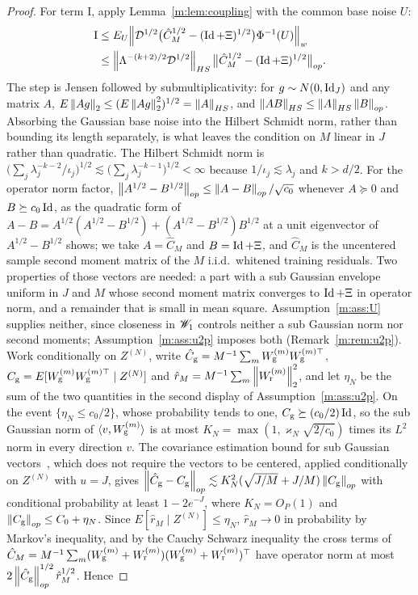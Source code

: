 \begin{proof}
For term I, apply Lemma~\ref{m:lem:coupling} with the common base noise $U$:
\[
\begin{aligned}
\mathrm I&\le E_U\Big\|\mathcal D^{1/2}\big(\hat C_M^{1/2}-(\operatorname{Id}+\Xi)^{1/2}\big)\Phi^{-1}(U)\Big\|_w\\
&\le\Big\|\Lambda^{-(k+2)/2}\mathcal D^{1/2}\Big\|_{HS}\,\big\|\hat C_M^{1/2}-(\operatorname{Id}+\Xi)^{1/2}\big\|_{op} .
\end{aligned}
\]
The step is Jensen followed by submultiplicativity: for $g\sim N(0,\operatorname{Id}_J)$ and any matrix $A$, $E\left\|Ag\right\|_2\le(E\left\|Ag\right\|_2^2)^{1/2}=\left\|A\right\|_{HS}$, and $\left\|AB\right\|_{HS}\le\left\|A\right\|_{HS}\left\|B\right\|_{op}$. Absorbing the Gaussian base noise into the Hilbert Schmidt norm, rather than bounding its length separately, is what leaves the condition on $M$ linear in $J$ rather than quadratic. The Hilbert Schmidt norm is $\big(\sum_j\lambda_j^{-k-2}/\iota_j\big)^{1/2}\lesssim\big(\sum_j\lambda_j^{-k-1}\big)^{1/2}<\infty$ because $1/\iota_j\lesssim\lambda_j$ and $k>d/2$. For the operator norm factor, $\left\|A^{1/2}-B^{1/2}\right\|_{op}\le\left\|A-B\right\|_{op}/\sqrt{c_0}$ whenever $A\succeq0$ and $B\succeq c_0\operatorname{Id}$, as the quadratic form of $A-B=A^{1/2}(A^{1/2}-B^{1/2})+(A^{1/2}-B^{1/2})B^{1/2}$ at a unit eigenvector of $A^{1/2}-B^{1/2}$ shows; we take $A=\hat C_M$ and $B=\operatorname{Id}+\Xi$, and $\hat C_M$ is the uncentered sample second moment matrix of the $M$ i.i.d.\ whitened training residuals. Two properties of those vectors are needed: a part with a sub Gaussian envelope uniform in $J$ and $M$ whose second moment matrix converges to $\operatorname{Id}+\Xi$ in operator norm, and a remainder that is small in mean square. Assumption~\ref{m:ass:U} supplies neither, since closeness in $\mathscr{W}_1$ controls neither a sub Gaussian norm nor second moments; Assumption~\ref{m:ass:u2p} imposes both (Remark~\ref{m:rem:u2p}). Work conditionally on $Z^{(N)}$, write $\hat C_{\rm g}=M^{-1}\sum_mW^{(m)}_{\rm g}W^{(m)\top}_{\rm g}$, $C_{\rm g}=E[W^{(m)}_{\rm g}W^{(m)\top}_{\rm g}\mid Z^{(N)}]$ and $\hat r_M=M^{-1}\sum_m\left\|W^{(m)}_{\rm r}\right\|^2_2$, and let $\eta_N$ be the sum of the two quantities in the second display of Assumption~\ref{m:ass:u2p}. On the event $\{\eta_N\le c_0/2\}$, whose probability tends to one, $C_{\rm g}\succeq(c_0/2)\operatorname{Id}$, so the sub Gaussian norm of $\langle v,W^{(m)}_{\rm g}\rangle$ is at most $K_N=\max(1,\varkappa_N\sqrt{2/c_0})$ times its $L^2$ norm in every direction $v$. The covariance estimation bound for sub Gaussian vectors~\cite[Theorem 4.7.1 and Exercise 4.7.3]{vershynin2018}, which does not require the vectors to be centered, applied conditionally on $Z^{(N)}$ with $u=J$, gives $\left\|\hat C_{\rm g}-C_{\rm g}\right\|_{op}\lesssim K_N^2(\sqrt{J/M}+J/M)\left\|C_{\rm g}\right\|_{op}$ with conditional probability at least $1-2e^{-J}$, where $K_N=O_P(1)$ and $\left\|C_{\rm g}\right\|_{op}\le C_0+\eta_N$. Since $E[\hat r_M\mid Z^{(N)}]\le\eta_N$, $\hat r_M\to0$ in probability by Markov's inequality, and by the Cauchy Schwarz inequality the cross terms of $\hat C_M=M^{-1}\sum_m(W^{(m)}_{\rm g}+W^{(m)}_{\rm r})(W^{(m)}_{\rm g}+W^{(m)}_{\rm r})^\top$ have operator norm at most $2\left\|\hat C_{\rm g}\right\|^{1/2}_{op}\hat r_M^{1/2}$. Hence

\end{proof}
